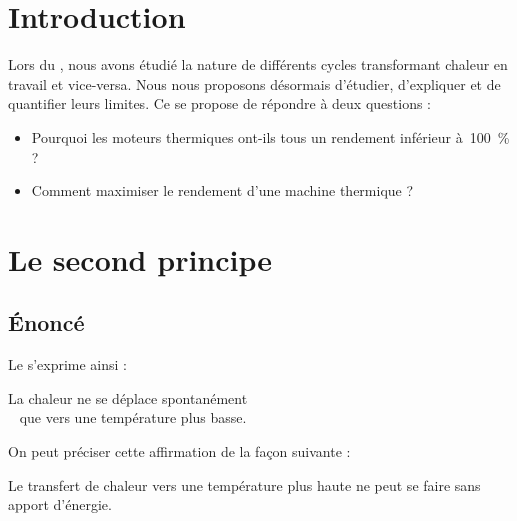 

\section*{Introduction}

	Lors du \courssix, nous avons étudié la nature de différents cycles transformant chaleur en travail et vice-versa. Nous nous proposons désormais d’étudier, d’expliquer et de quantifier leurs limites. Ce \courssept se propose de répondre à deux questions :

	\begin{itemize}
		\item Pourquoi les moteurs thermiques ont-ils tous un rendement inférieur à~\SI{100}{\percent} ?
		\item Comment maximiser le rendement d’une machine thermique ?
	\end{itemize} \dontbreakpage \vspace{2em}


\section{Le second principe}



	\subsection{Énoncé}

		Le  s’exprime ainsi :

		\begin{principe}
		La chaleur ne se déplace spontanément\hspace{1ex} \\		
		\hspace{1ex} \  que vers une température plus basse.
		\end{principe}

		On peut préciser cette affirmation de la façon suivante :

		\begin{trucimportant}
		Le transfert de chaleur vers une température plus haute\linebreak
		ne peut se faire sans apport d’énergie.
		\end{trucimportant}

